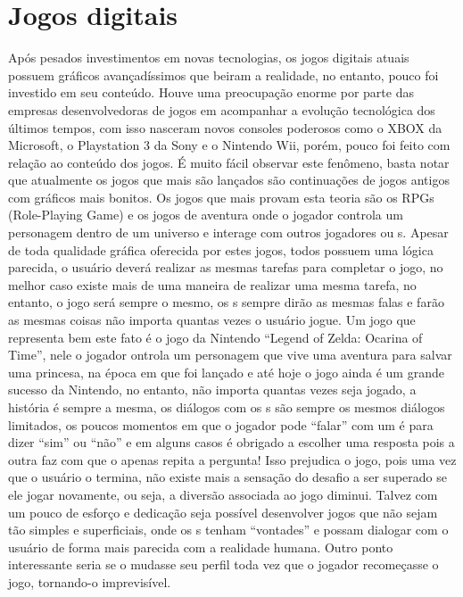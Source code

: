 \section{Jogos digitais}

Após pesados investimentos em novas tecnologias, os jogos digitais atuais possuem gráficos avançadíssimos que beiram a realidade, no entanto, pouco foi investido em seu conteúdo. Houve uma preocupação enorme por parte das empresas desenvolvedoras de jogos em acompanhar a evolução tecnológica dos últimos tempos, com isso nasceram novos consoles poderosos como o XBOX da Microsoft, o Playstation 3 da Sony e o Nintendo Wii, porém, pouco foi feito com relação ao conteúdo dos jogos. É muito fácil observar este fenômeno, basta notar que atualmente os jogos que mais são lançados são continuações de jogos antigos com gráficos mais bonitos.
Os jogos que mais provam esta teoria são os RPGs (Role-Playing Game) e os jogos de aventura onde o jogador controla um personagem dentro de um universo e  interage com outros jogadores ou \npc{}s. Apesar de toda qualidade gráfica oferecida por estes jogos, todos possuem uma lógica parecida, o usuário deverá realizar as mesmas tarefas para completar o jogo, no melhor caso existe mais de uma maneira de realizar uma mesma tarefa, no entanto, o jogo será sempre o mesmo, os \npc{}s sempre dirão as mesmas falas e farão as mesmas coisas não importa quantas vezes o usuário jogue.
Um jogo que representa bem este fato é o jogo da Nintendo ``Legend of Zelda: Ocarina of Time'', nele o jogador ontrola um personagem que vive uma aventura para salvar uma princesa, na época em que foi lançado e até hoje o jogo ainda é um grande sucesso da Nintendo, no entanto, não importa quantas vezes seja jogado, a história é sempre a mesma, os diálogos com os \npc{}s são sempre os mesmos diálogos limitados, os poucos momentos em que o jogador pode ``falar'' com um \npc{} é para dizer ``sim'' ou ``não'' e em alguns casos é obrigado a escolher uma resposta pois a outra faz com que o \npc{} apenas repita a pergunta! Isso prejudica o jogo, pois uma vez que o usuário o termina, não existe mais a sensação do desafio a ser superado se ele jogar novamente, ou seja, a diversão associada ao jogo diminui.
Talvez com um pouco de esforço e dedicação seja possível desenvolver jogos que não sejam tão simples e superficiais, onde os \npc{}s tenham ``vontades'' e possam dialogar com o usuário de forma mais parecida com a realidade humana. Outro ponto interessante seria se o \npc{} mudasse seu perfil toda vez que o jogador recomeçasse o jogo, tornando-o imprevisível.

